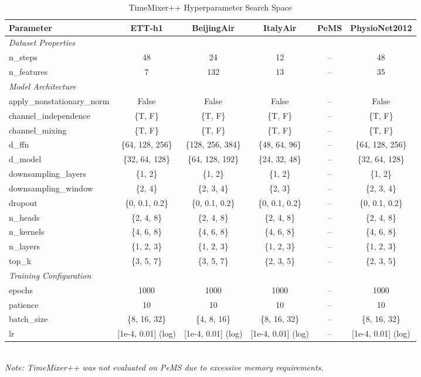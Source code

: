 \begin{table}[H]
\centering
\caption{TimeMixer++ Hyperparameter Search Space}
\label{tab:hyperparam_timemixerpp}
\begin{adjustbox}{max width=\textwidth}
\begin{small}
\begin{tabular}{l|ccccc}
\toprule
\textbf{Parameter} & \textbf{ETT-h1} & \textbf{BeijingAir} & \textbf{ItalyAir} & \textbf{PeMS} & \textbf{PhysioNet2012} \\
\midrule
\multicolumn{6}{l}{\textit{Dataset Properties}} \\
n\_steps & 48 & 24 & 12 & -- & 48 \\
n\_features & 7 & 132 & 13 & -- & 35 \\
\midrule
\multicolumn{6}{l}{\textit{Model Architecture}} \\
apply\_nonstationary\_norm & False & False & False & -- & False \\
channel\_independence & \{T, F\} & \{T, F\} & \{T, F\} & -- & \{T, F\} \\
channel\_mixing & \{T, F\} & \{T, F\} & \{T, F\} & -- & \{T, F\} \\
d\_ffn & \{64, 128, 256\} & \{128, 256, 384\} & \{48, 64, 96\} & -- & \{64, 128, 256\} \\
d\_model & \{32, 64, 128\} & \{64, 128, 192\} & \{24, 32, 48\} & -- & \{32, 64, 128\} \\
downsampling\_layers & \{1, 2\} & \{1, 2\} & \{1, 2\} & -- & \{1, 2\} \\
downsampling\_window & \{2, 4\} & \{2, 3, 4\} & \{2, 3\} & -- & \{2, 3, 4\} \\
dropout & \{0, 0.1, 0.2\} & \{0, 0.1, 0.2\} & \{0, 0.1, 0.2\} & -- & \{0, 0.1, 0.2\} \\
n\_heads & \{2, 4, 8\} & \{2, 4, 8\} & \{2, 4, 8\} & -- & \{2, 4, 8\} \\
n\_kernels & \{4, 6, 8\} & \{4, 6, 8\} & \{4, 6, 8\} & -- & \{4, 6, 8\} \\
n\_layers & \{1, 2, 3\} & \{1, 2, 3\} & \{1, 2, 3\} & -- & \{1, 2, 3\} \\
top\_k & \{3, 5, 7\} & \{3, 5, 7\} & \{2, 3, 5\} & -- & \{2, 3, 5\} \\
\midrule
\multicolumn{6}{l}{\textit{Training Configuration}} \\
epochs & 1000 & 1000 & 1000 & -- & 1000 \\
patience & 10 & 10 & 10 & -- & 10 \\
batch\_size & \{8, 16, 32\} & \{4, 8, 16\} & \{8, 16, 32\} & -- & \{8, 16, 32\} \\
lr & [1e-4, 0.01] (log) & [1e-4, 0.01] (log) & [1e-4, 0.01] (log) & -- & [1e-4, 0.01] (log) \\
\bottomrule
\end{tabular}
\end{small}
\end{adjustbox}
\\[2pt]
\footnotesize{\textit{Note: TimeMixer++ was not evaluated on PeMS due to excessive memory requirements.}}
\end{table}